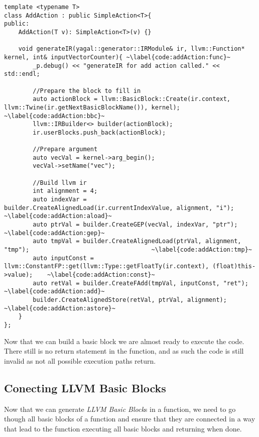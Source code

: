 \begin{lstlisting}[caption={The AddAction class}, label={code:addAction}]
template <typename T>
class AddAction : public SimpleAction<T>{
public:
    AddAction(T v): SimpleAction<T>(v) {}

    void generateIR(yagal::generator::IRModule& ir, llvm::Function* kernel, int& inputVectorCounter){ ~\label{code:addAction:func}~
        _p.debug() << "generateIR for add action called." << std::endl;

        //Prepare the block to fill in
        auto actionBlock = llvm::BasicBlock::Create(ir.context, llvm::Twine(ir.getNextBasicBlockName()), kernel); ~\label{code:addAction:bbc}~
        llvm::IRBuilder<> builder(actionBlock);
        ir.userBlocks.push_back(actionBlock);

        //Prepare argument
        auto vecVal = kernel->arg_begin();
        vecVal->setName("vec");

        //Build llvm ir
        int alignment = 4;
        auto indexVar = builder.CreateAlignedLoad(ir.currentIndexValue, alignment, "i");                    ~\label{code:addAction:aload}~
        auto ptrVal = builder.CreateGEP(vecVal, indexVar, "ptr");                                           ~\label{code:addAction:gep}~
        auto tmpVal = builder.CreateAlignedLoad(ptrVal, alignment, "tmp");                                  ~\label{code:addAction:tmp}~
        auto inputConst = llvm::ConstantFP::get(llvm::Type::getFloatTy(ir.context), (float)this->value);    ~\label{code:addAction:const}~
        auto retVal = builder.CreateFAdd(tmpVal, inputConst, "ret");                                        ~\label{code:addAction:add}~
        builder.CreateAlignedStore(retVal, ptrVal, alignment);                                              ~\label{code:addAction:astore}~
    }
};
\end{lstlisting}

Now that we can build a basic block we are almost ready to execute the code. There still is no return statement in the function, and as such the code is still invalid as not all possible execution paths return.

\subsection{Conecting LLVM Basic Blocks} \label{sec:bblinking}
Now that we can generate \textit{LLVM Basic Block}s in a function, we need to go though all basic blocks of a function and ensure that they are connected in a way that lead to the function executing all basic blocks and returning when done.

